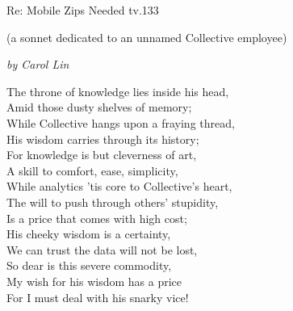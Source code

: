 \documentclass[10pt,letterpaper]{article}
\begin{document}
\begin{centering}

{\Huge Re: Mobile Zips Needed tv.133}  \vspace{.5cm} 

{\large (a sonnet dedicated to an unnamed Collective employee)} \vspace{.5cm}

\emph{\large by Carol Lin} \vspace{1cm}

{
\Large
\noindent The throne of knowledge lies inside his head, \\
Amid those dusty shelves of memory; \\
While Collective hangs upon a fraying thread, \\
His wisdom carries through its history; \\
For knowledge is but cleverness of art, \\
A skill to comfort, ease, simplicity, \\
While analytics 'tis core to Collective's heart, \\
The will to push through others' stupidity, \\
Is a price that comes with high cost; \\
His cheeky wisdom is a certainty, \\ 
We can trust the data will not be lost, \\
So dear is this severe commodity, \\
My wish for his wisdom has a price \\
For I must deal with his snarky vice! \\
}

\end{centering}
\end{document}
